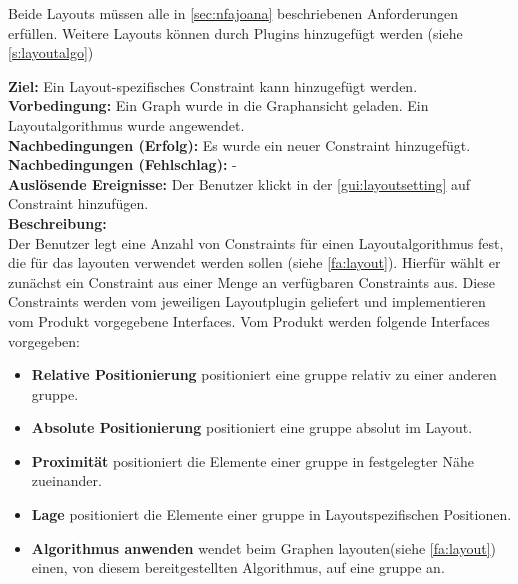 Beide Layouts müssen alle in \autoref{sec:nfajoana} beschriebenen Anforderungen erfüllen.
Weitere Layouts können durch Plugins hinzugefügt werden (siehe \ref{s:layoutalgo})

\label{fa:constraints}
\textbf{Ziel:} Ein Layout-spezifisches Constraint kann hinzugefügt werden.\\
\textbf{Vorbedingung:} Ein Graph wurde in die Graphansicht geladen. Ein Layoutalgorithmus wurde angewendet.\\
\textbf{Nachbedingungen (Erfolg):} Es wurde ein neuer Constraint hinzugefügt.\\
\textbf{Nachbedingungen (Fehlschlag):} -\\
\textbf{Auslösende Ereignisse:} Der Benutzer klickt in der \ref{gui:layoutsetting} auf Constraint hinzufügen.\\
\textbf{Beschreibung: } \\
Der Benutzer legt eine Anzahl von Constraints für einen Layoutalgorithmus fest, die für das layouten verwendet werden sollen (siehe \ref{fa:layout}). Hierfür wählt er zunächst ein Constraint aus einer Menge an verfügbaren Constraints aus. Diese Constraints werden vom jeweiligen Layoutplugin geliefert und implementieren vom Produkt vorgegebene Interfaces. Vom Produkt werden folgende Interfaces vorgegeben:
\begin{itemize}[nolistsep]
  \item \textbf{Relative Positionierung} positioniert eine \gls{gruppe} relativ zu einer anderen \gls{gruppe}.
  \item \textbf{Absolute Positionierung} positioniert eine \gls{gruppe} absolut im Layout.
  \item \textbf{Proximität} positioniert die Elemente einer \gls{gruppe} in festgelegter Nähe zueinander.
  \item \textbf{Lage} positioniert die Elemente einer \gls{gruppe} in Layoutspezifischen Positionen.
  \item \textbf{Algorithmus anwenden} wendet beim Graphen layouten(siehe \ref{fa:layout}) einen, von diesem bereitgestellten Algorithmus, auf eine \gls{gruppe} an. 
\end{itemize}

